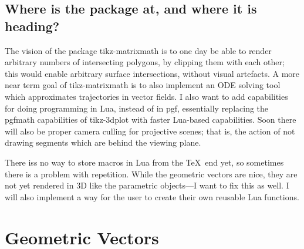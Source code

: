 \documentclass[12pt]{report}
\begin{document}
        \section{Where is the package at, and where it is heading?}
            The vision of the package tikz-matrixmath is to one 
            day be able to render arbitrary numbers of intersecting 
            polygons, by clipping them with each other; this would 
            enable arbitrary surface intersections, without 
            visual artefacts. A more near term goal of 
            tikz-matrixmath is to also implement an ODE 
            solving tool which approximates trajectories in 
            vector fields. I also want to add capabilities for 
            doing programming in Lua, instead of in pgf,
            essentially replacing the pgfmath capabilities of 
            tikz-3dplot with faster Lua-based capabilities.
            Soon there will also be proper camera culling for 
            projective scenes; that is, the action of not drawing 
            segments which are behind the viewing plane.\par 
            There iss no way  to store macros in Lua from the \TeX\      
            end yet, so sometimes there is a problem with 
            repetition. While the geometric vectors are nice,
            they are not yet rendered in 3D like the parametric 
            objects---I want to fix this as well.
            I will also implement a way for the user to create 
            their own reusable Lua functions.
    \chapter{Geometric Vectors}
\end{document}
